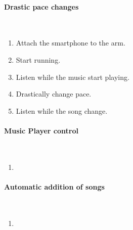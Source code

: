\paragraph{Drastic pace changes}~\\
\begin{enumerate}
	\item Attach the smartphone to the arm.
	\item Start running.
	\item Listen while the music start playing.
	\item Drastically change pace.
	\item Listen while the song change.
\end{enumerate} 

\paragraph{Music Player control}~\\
\begin{enumerate}
	\item 
\end{enumerate} 

\paragraph{Automatic addition of songs}~\\
\begin{enumerate}
	\item 
\end{enumerate} 

